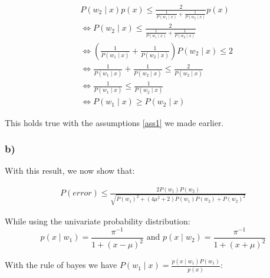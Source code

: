 \documentclass[10pt,a4paper]{article}
\begin{document}
\begin{align*}	
	&P(w_2 \mid x)p(x) \le \frac{2}{\frac{1}{P(w_1\mid x)} + \frac{1}{P(w_2 \mid x)}} p(x) \\
	&\Leftrightarrow P(w_2 \mid x) \le \frac{2}{\frac{1}{P(w_1\mid x)} + \frac{1}{P(w_2 \mid x)}} \\
	&\Leftrightarrow (\frac{1}{P(w_1\mid x)} + \frac{1}{P(w_2 \mid x)}) P(w_2 \mid x) \le 2 \\
	&\Leftrightarrow \frac{1}{P(w_1\mid x)} + \frac{1}{P(w_2 \mid x)} \le \frac{2}{P(w_2 \mid x)} \\
	&\Leftrightarrow \frac{1}{P(w_1 \mid x)} \le \frac{1}{P(w_2\mid x)} \\
	&\Leftrightarrow P(w_1 \mid x) \ge P(w_2\mid x)
\end{align*}

This holds true with the assumptions \ref{ass1} we made earlier.

\subsubsection*{b)}

With this result, we now show that:

\begin{align*}
P(error) \le \frac{2P(w_1)P(w_2)}{\sqrt{P(w_1)^2 + (4\mu^2 + 2)P(w_1)P(w_2) + P(w_2)^2}}
\end{align*}

While using the univariate probability distribution:
$$p(x\mid w_1) = \frac{\pi^{-1}}{1+ (x - \mu)^2} \textrm{ and } p(x \mid w_2) = \frac{\pi^{-1}}{1 + (x + \mu)^2}$$

With the rule of bayes we have $P(w_1 \mid x) = \frac{p(x \mid w_1)P(w_1)}{p(x)}$:
\end{document}
